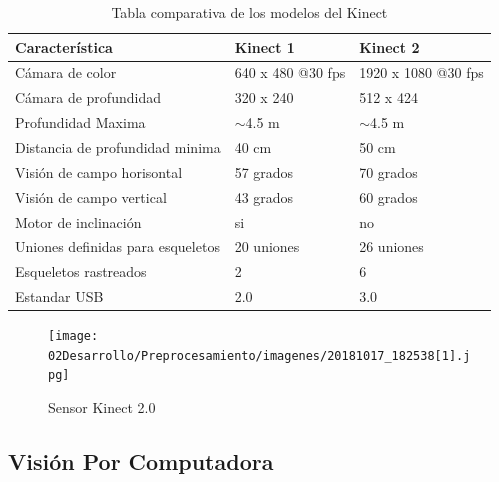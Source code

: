         \begin{table}[!htb]
        	\centering
        	\caption{Tabla comparativa de los modelos del Kinect}
        	\label{tab:Kinect}
        		\begin{tabular}{lll}
        			\hline
        			Característica                    & Kinect 1          & Kinect 2            \\ \hline
        			Cámara de color                   & 640 x 480 @30 fps & 1920 x 1080 @30 fps \\
        			Cámara de profundidad             & 320 x 240         & 512 x 424           \\
        			Profundidad Maxima                & $\sim$4.5 m       & $\sim$4.5 m         \\
        			Distancia de profundidad minima   & 40 cm             & 50 cm               \\
        			Visión de campo horisontal        & 57 grados         & 70 grados           \\
        			Visión de campo vertical          & 43 grados         & 60 grados           \\
        			Motor de inclinación              & si                & no                  \\
        			Uniones definidas para esqueletos & 20 uniones        & 26 uniones          \\
        			Esqueletos rastreados             & 2                 & 6                   \\
        			Estandar USB                      & 2.0               & 3.0                 \\ \hline
        		\end{tabular}%
        \end{table}
    
        \begin{figure}[!htb]
        	\centering
        	\texttt{[image: 02Desarrollo/Preprocesamiento/imagenes/20181017\_182538[1].jpg]}
        	\caption{Sensor Kinect 2.0} 
        	\label{fig:kinect}
        \end{figure}
        
        
        
        \subsection{Visión Por Computadora}
        
